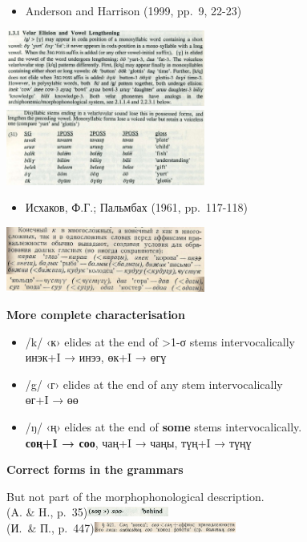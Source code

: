 \documentclass[fontscale=0.33,landscape,paperwidth=48in,paperheight=36in]{baposter}  %
\newcommand{\htwo}[1]{{\htwofont \textbf{\dotfill{}#1\dotfill{}}}}
\begin{document}
\begin{poster}
{\begin{multicols}{2}
					\begin{itemize}
						\item Anderson and Harrison (1999, pp.\ 9, 22-23)
					\end{itemize}
					\includegraphics[width=0.49\textwidth]{img/andersonharrison9}\\
					\includegraphics[width=0.49\textwidth]{img/andersonharrison22-23}
					\begin{itemize}
						\item Исхаков, Ф.Г.; Пальмбах (1961, pp.\ 117-118)
					\end{itemize}
					\includegraphics[width=0.49\textwidth]{img/isxakovpalmbax117}

				\htwo{More complete characterisation}
				\begin{itemize}
					\item /k/ ‹к› elides at the end of >1-σ stems intervocalically\\
						инэк+I → инээ, өк+I → өгү
					\item /g/ ‹г› elides at the end of any stem intervocalically\\
						өг+I → өө 
					\item /ŋ/ ‹ң› elides at the end of \textbf{some} stems intervocalically.\\
						\textbf{соң+I → соо}, чаң+I → чаңы, түң+I → түңү
				\end{itemize}

				\htwo{Correct forms in the grammars}

				But not part of the morphophonological description.\\
				(A. \& H., p.\ 35)\hfill{}\includegraphics[width=0.2\textwidth]{img/andersonharrison35}\\
				(И.\ \& П., p.\ 447)\hfill{}\includegraphics[width=0.35\textwidth]{img/isxakovpalmbax447}



\end{multicols}}
\end{poster}
\end{document}
